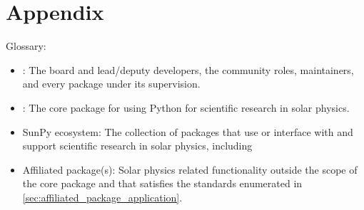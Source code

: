 \section*{Appendix}
\label{appendix}
Glossary:

\begin{itemize}
\item \sunpyproj: The board and lead/deputy developers, the community roles, maintainers, and every package under its supervision.
\item \sunpypkg: The core package for using Python for scientific research in solar physics.
\item SunPy ecosystem: The collection of packages that use or interface with \sunpypkg and support scientific research in solar physics, including \sunpypkg
\item Affiliated package(s): Solar physics related functionality outside the scope of the \sunpypkg core package and that satisfies the standards enumerated in \autoref{sec:affiliated_package_application}.
\end{itemize}
